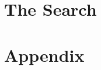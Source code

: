 \documentclass[oneside,12pt,final]{sty/ucthesis-CA2012}
\begin{document}
\begin{mainmatter}
\part{The Search}





\part{Appendix}
\appendix
\dsp




\end{mainmatter}

\ssp


\end{document}
